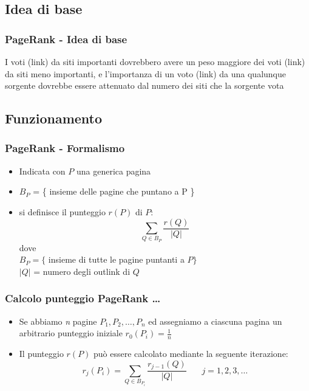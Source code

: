 \documentclass{beamer}
\begin{document}
\subsection{Idea di base}
\begin{frame}
	\frametitle{PageRank - Idea di base}
	I voti (link) da siti importanti dovrebbero avere un peso maggiore dei voti (link) da siti meno importanti, e l'importanza di un voto (link) da una qualunque sorgente dovrebbe essere attenuato dal numero dei siti che la sorgente vota
\end{frame}

\subsection{Funzionamento}
\begin{frame}
	\frametitle{PageRank - Formalismo}
	\begin{itemize}
		\item Indicata con $P$ una generica pagina
		\item $B_P$ = \{ insieme delle pagine che puntano a P \}
		\item si definisce il punteggio $r(P)$ di $P$: $$\sum_{Q \in B_P}\frac{r(Q)}{|Q|}$$ dove \\ $B_P=\{$ insieme di tutte le pagine puntanti a $P\}$ \\ $|Q|$ = numero degli outlink di $Q$
	\end{itemize}
\end{frame}


\begin{frame}
	\frametitle{Calcolo punteggio PageRank \dots}
	\begin{itemize}
		\item Se abbiamo \emph{n} pagine $P_1,P_2,\dots,P_n$ ed assegniamo a ciascuna pagina un arbitrario punteggio iniziale $r_0(P_i)=\frac{1}{n}$
		\item Il punteggio $r(P)$ può essere calcolato mediante la seguente iterazione: $$r_j(P_i)= \sum_{Q \in B_{P_i}}\frac{r_{j-1}(Q)}{|Q|} ~~~~~~~~ j=1,2,3,\dots$$
	\end{itemize}
\end{frame}
\end{document}
